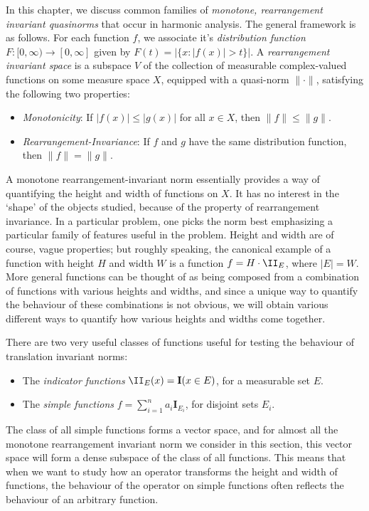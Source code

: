 In this chapter, we discuss common families of \emph{monotone, rearrangement invariant quasinorms} that occur in harmonic analysis. The general framework is as follows. For each function $f$, we associate it's \emph{distribution function} $F: [0,\infty) \to [0,\infty]$ given by $F(t) = |\{ x : |f(x)| > t \}|$. A \emph{rearrangement invariant space} is a subspace $V$ of the collection of measurable complex-valued functions on some measure space $X$, equipped with a quasi-norm $\| \cdot \|$, satisfying the following two properties:
%
\begin{itemize}
    \item \emph{Monotonicity}: If $|f(x)| \leq |g(x)|$ for all $x \in X$, then $\| f \| \leq \| g \|$.

    \item \emph{Rearrangement-Invariance}: If $f$ and $g$ have the same distribution function, then $\| f \| = \| g \|$.
\end{itemize}
%
A monotone rearrangement-invariant norm essentially provides a way of quantifying the height and width of functions on $X$. It has no interest in the `shape' of the objects studied, because of the property of rearrangement invariance. In a particular problem, one picks the norm best emphasizing a particular family of features useful in the problem. Height and width are of course, vague properties; but roughly speaking, the canonical example of a function with height $H$ and width $W$ is a function $f = H \cdot \II_E$, where $|E| = W$. More general functions can be thought of as being composed from a combination of  functions with various heights and widths, and since a unique way to quantify the behaviour of these combinations is not obvious, we will obtain various different ways to quantify how various heights and widths come together.

There are two very useful classes of functions useful for testing the behaviour of translation invariant norms:
%
\begin{itemize}
    \item The \emph{indicator functions} $\II_E(x) = \mathbf{I}(x \in E)$, for a measurable set $E$.
    \item The \emph{simple functions} $f = \sum_{i = 1}^n a_i \mathbf{I}_{E_i}$, for disjoint sets $E_i$.
\end{itemize}
%
The class of all simple functions forms a vector space, and for almost all the monotone rearrangement invariant norm we consider in this section, this vector space will form a dense subspace of the class of all functions. This means that when we want to study how an operator transforms the height and width of functions, the behaviour of the operator on simple functions often reflects the behaviour of an arbitrary function.

